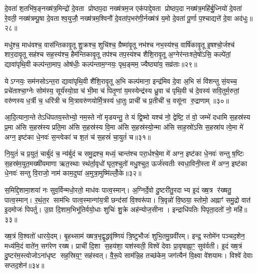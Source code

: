 दे॒वता॑ श॒तभि॑ष॒ङ्नख्ष॑त्र॒मिन्द्रो॑ दे॒वता प्रोष्ठप॒दा नख्ष॑त्रम॒ज एक॑पाद्दे॒वता प्रोष्ठप॒दा नख्ष॑त्र॒महि॑र्बु॒ध्नियो॑ दे॒वता॑ रे॒वती॒ नख्ष॑त्रम्पू॒षा दे॒वताश्व॒युजौ॒ नख्ष॑त्रम॒श्विनौ॑ दे॒वता॑प॒भर॑णी॒र्नख्ष॑त्रं य॒मो दे॒वता॑ पू॒र्णा प॒श्चाद्यत्ते॑ दे॒वा अद॑धुः॥२८॥

{\anuvakamend[{फल्गु॑नी॒ नख्ष॑त्रं॒ वस॑व॒स्त्रय॑स्त्रिशच्च॥10॥}]}

मधु॑श्च॒ माध॑वश्च॒ वास॑न्तिकावृ॒तू शु॒क्रश्च॒ शुचि॑श्च॒ ग्रैष्मा॑वृ॒तू नभ॑श्च नभ॒स्य॑श्च॒ वार्\mbox{}षि॑कावृ॒तू इ॒षश्चो॒र्जश्च॑ शार॒दावृ॒तू सह॑श्च सह॒स्य॑श्च॒ हैम॑न्तिकावृ॒तू तप॑श्च तप॒स्य॑श्च शैशि॒रावृ॒तू अ॒ग्नेर॑न्तःश्ले॒षो॑ऽसि॒ कल्पे॑तां॒ द्यावा॑पृथि॒वी कल्प॑न्ता॒माप॒ ओष॑धीः॒ कल्प॑न्ताम॒ग्नयः॒ पृथ॒ङ्मम॒ ज्यैष्ठ्या॑य॒ सव्र॑ताः॥२९॥

येऽग्नयः॒ सम॑नसोऽन्त॒रा द्यावा॑पृथि॒वी शै॑शि॒रावृ॒तू अ॒भि कल्प॑माना॒ इन्द्र॑मिव दे॒वा अ॒भि सं वि॑शन्तु सं॒यच्च॒ प्रचे॑ताश्चा॒ग्नेः सोम॑स्य॒ सूर्य॑स्यो॒ग्रा च॑ भी॒मा च॑ पितृ॒णां य॒मस्येन्द्र॑स्य ध्रु॒वा च॑ पृथि॒वी च॑ दे॒वस्य॑ सवि॒तुर्म॒रुतां॒ वरु॑णस्य ध॒र्त्री च॒ धरि॑त्री च मि॒त्रावरु॑णयोर्मि॒त्रस्य॑ धा॒तुः प्राची॑ च प्र॒तीची॑ च॒ वसू॑ना रु॒द्राणाम्॥३०॥

आ॒दि॒त्याना॒न्ते तेऽधि॑पतय॒स्तेभ्यो॒ नम॒स्ते नो॑ मृडयन्तु॒ ते यं द्वि॒ष्मो यश्च॑ नो॒ द्वेष्टि॒ तं वो॒ जम्भे॑ दधामि स॒हस्र॑स्य प्र॒मा अ॑सि स॒हस्र॑स्य प्रति॒मा अ॑सि स॒हस्र॑स्य वि॒मा अ॑सि स॒हस्र॑स्यो॒न्मा अ॑सि साह॒स्रो॑ऽसि स॒हस्रा॑य त्वे॒मा मे॑ अग्न॒ इष्ट॑का धे॒नवः॑ स॒न्त्वेका॑ च श॒तं च॑ स॒हस्रं॑ चा॒युतं॑ च॥३१॥

नि॒युतं॑ च प्र॒युतं॒ चार्बु॑दं च॒ न्य॑र्बुदं च समु॒द्रश्च॒ मध्यं॒ चान्त॑श्च परा॒र्धश्चे॒मा मे॑ अग्न॒ इष्ट॑का धे॒नवः॑ सन्तु ष॒ष्टिः स॒हस्र॑म॒युत॒मख्षी॑यमाणा ऋत॒स्थाः स्थ॑र्ता॒वृधो॑ घृत॒श्चुतो॑ मधु॒श्चुत॒ ऊर्ज॑स्वतीः स्वधा॒विनी॒स्ता मे॑ अग्न॒ इष्ट॑का धे॒नवः॑ सन्तु वि॒राजो॒ नाम॑ काम॒दुघा॑ अ॒मुत्रा॒मुष्मि॑ल्लोँ॒के॥३२॥

{\anuvakamend[{सव्र॑ता रु॒द्राणा॑म॒युत॑ञ्च॒ पञ्च॑चत्वारिशच्च॥11॥}]}

स॒मिद्दि॒शामा॒शया॑ नः सुव॒र्विन्मधो॒रतो॒ माध॑वः पात्व॒स्मान्। अ॒ग्निर्दे॒वो दु॒ष्टरी॑तु॒रदाभ्य इ॒दं ख्ष॒त्र र॑ख्षतु॒ पात्व॒स्मान्। र॒थं॒त॒र साम॑भिः पात्व॒स्मान्गा॑य॒त्री छन्द॑सां वि॒श्वरू॑पा। त्रि॒वृन्नो॑ वि॒ष्ठया॒ स्तोमो॒ अह्नाꣳ॑ समु॒द्रो वात॑ इ॒दमोजः॑ पिपर्तु। उ॒ग्रा दि॒शाम॒भिभू॑तिर्वयो॒धाः शुचिः॑ शु॒क्रे अह॑न्योज॒सीना। इन्द्राधि॑पतिः पिपृता॒दतो॑ नो॒ महि॑॥३३॥

ख्ष॒त्रं वि॒श्वतो॑ धारये॒दम्। बृ॒हथ्साम॑ ख्षत्र॒भृद्वृ॒द्धवृ॑ष्णियं त्रि॒ष्टुभौजः॑ शुभि॒तमु॒ग्रवी॑रम्। इन्द्र॒ स्तोमे॑न पञ्चद॒शेन॒ मध्य॑मि॒दं वाते॑न॒ सग॑रेण रख्ष। प्राची॑ दि॒शा स॒हय॑शा॒ यश॑स्वती॒ विश्वे॑ देवाः प्रा॒वृषाह्ना॒ꣳ॒ सुव॑र्वती। इ॒दं ख्ष॒त्रं दु॒ष्टर॑म॒स्त्वोजोऽना॑धृष्ट सह॒स्रिय॒ꣳ॒ सह॑स्वत्। वै॒रू॒पे साम॑न्नि॒ह तच्छ॑केम॒ जग॑त्यैनं वि॒क्ष्वा वे॑शयामः। विश्वे॑ देवाः सप्तद॒शेन॑॥३४॥

